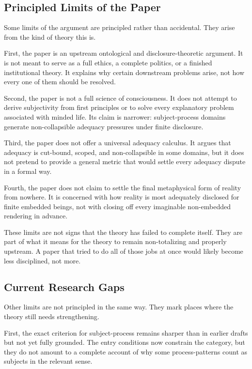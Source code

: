 \documentclass[11pt]{article}
\begin{document}
\subsection{Principled Limits of the Paper}

Some limits of the argument are principled rather than accidental. They arise from the kind of theory this is.

First, the paper is an upstream ontological and disclosure-theoretic argument. It is not meant to serve as a full ethics, a complete politics, or a finished institutional theory. It explains why certain downstream problems arise, not how every one of them should be resolved.

Second, the paper is not a full science of consciousness. It does not attempt to derive subjectivity from first principles or to solve every explanatory problem associated with minded life. Its claim is narrower: subject-process domains generate non-collapsible adequacy pressures under finite disclosure.

Third, the paper does not offer a universal adequacy calculus. It argues that adequacy is cut-bound, scoped, and non-collapsible in some domains, but it does not pretend to provide a general metric that would settle every adequacy dispute in a formal way.

Fourth, the paper does not claim to settle the final metaphysical form of reality from nowhere. It is concerned with how reality is most adequately disclosed for finite embedded beings, not with closing off every imaginable non-embedded rendering in advance.

These limits are not signs that the theory has failed to complete itself. They are part of what it means for the theory to remain non-totalizing and properly upstream. A paper that tried to do all of those jobs at once would likely become less disciplined, not more.

\subsection{Current Research Gaps}

Other limits are not principled in the same way. They mark places where the theory still needs strengthening.

First, the exact criterion for subject-process remains sharper than in earlier drafts but not yet fully grounded. The entry conditions now constrain the category, but they do not amount to a complete account of why some process-patterns count as subjects in the relevant sense.
\end{document}
